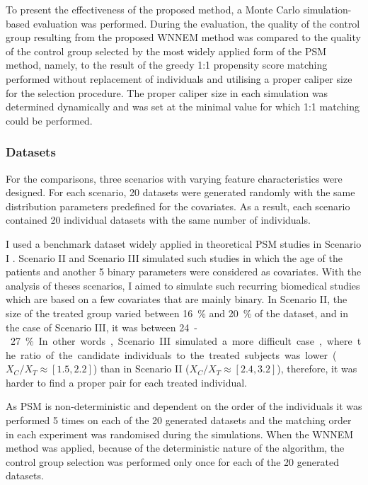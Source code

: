 		To present the effectiveness of the proposed method, a Monte Carlo simulation-based evaluation was performed. During the evaluation, the quality of the control group resulting from the proposed WNNEM method was compared to the quality of the control group selected by the most widely applied form of the PSM method, namely, to the result of the greedy 1:1 propensity score matching performed without replacement of individuals and utilising a proper caliper size for the selection procedure. The proper caliper size in each simulation was determined dynamically and was set at the minimal value for which 1:1 matching could be performed.
						        
		\subsubsection{Datasets}
		\label{sec:datasets_wnnem}
										
		For the comparisons, three scenarios with varying feature characteristics were designed. For each scenario, 20 datasets were generated randomly with the same distribution parameters predefined for the covariates. As a result, each scenario contained 20 individual datasets with the same number of individuals.
						  
		I used a benchmark dataset widely applied in theoretical PSM studies in Scenario I  \cite{austin2011comparing}. Scenario II and Scenario III simulated such studies in which the age of the patients and another 5 binary parameters were considered as covariates. With the analysis of theses scenarios, I aimed to simulate such recurring biomedical studies which are based on a few covariates that are mainly binary. In Scenario II, the size of the treated group varied between \SI{16}{\percent} and \SI{20}{\percent} of the dataset, and in the case of Scenario III, it was between \SI{24}-\SI{27}{\percent}. In other words, Scenario III simulated a more difficult case, where the ratio of the candidate individuals to the treated subjects was lower ($X_C/X_T \approx [1.5,2.2]$) than in Scenario II ($X_C/X_T \approx [2.4,3.2]$), therefore, it was harder to find a proper pair for each treated individual.
										
		As PSM is non-deterministic and dependent on the order of the individuals it was performed 5 times on each of the 20 generated datasets and the matching order in each experiment was randomised during the simulations. When the WNNEM method was applied, because of the deterministic nature of the algorithm, the control group selection was performed only once for each of the 20 generated datasets.
										

